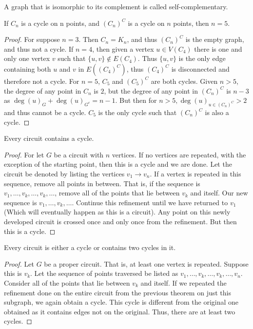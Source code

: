 \documentclass[crop=false,class=book]{standalone}
\begin{document}
\begin{definition}
A graph that is isomorphic to its complement is called self-complementary.
\end{definition}
\begin{theorem}
If $C_n$ is a cycle on n points, and $(C_n)^C$ is a cycle on $n$ points, then $n = 5$.
\end{theorem}
\begin{proof}
For suppose $n=3$. Then $C_n = K_n$, and thus $(C_n)^C$ is the empty graph, and thus not a cycle. If $n = 4$, then given a vertex $u\in V(C_4)$ there is one and only one vertex $v$ such that $\{u,v\} \notin E(C_4)$. Thus $\{u,v\}$ is the only edge containing both $u$ and $v$ in $E((C_4)^C)$, thus $(C_4)^C$ is disconnected and therefore not a cycle. For $n=5$, $C_5$ and $(C_5)^C$ are both cycles. Given $n>5$, the degree of any point in $C_{n}$ is $2$, but the degree of any point in $(C_n)^C$ is $n-3$ as $\deg(u)_G + \deg(u)_{G^c} = n-1$. But then for $n>5, \deg(u)_{u\in (C_n)^C} > 2$ and thus cannot be a cycle. $C_5$ is the only cycle such that $(C_n)^C$ is also a cycle.
\end{proof}
\begin{theorem}
Every circuit contains a cycle.
\end{theorem}
\begin{proof}
For let $G$ be a circuit with $n$ vertices. If no vertices are repeated, with the exception of the starting point, then this is a cycle and we are done. Let the circuit be denoted by listing the vertices $v_1 \rightarrow v_n$. If a vertex is repeated in this sequence, remove all points in between. That is, if the sequence is $v_1,\hdots, v_k,\hdots, v_k, \hdots$, remove all of the points that lie between $v_k$ and itself. Our new sequence is $v_1, \hdots, v_k, \hdots$. Continue this refinement until we have returned to $v_1$ (Which will eventually happen as this is a circuit). Any point on this newly developed circuit is crossed once and only once from the refinement. But then this is a cycle.
\end{proof}
\begin{theorem}
Every circuit is either a cycle or contains two cycles in it.
\end{theorem}
\begin{proof}
Let $G$ be a proper circuit. That is, at least one vertex is repeated. Suppose this is $v_k$. Let the sequence of points traversed be listed as $v_1,\hdots, v_k, \hdots,v_k, \hdots, v_n$. Consider all of the points that lie between $v_k$ and itself. If we repeated the refinement done on the entire circuit from the previous theorem on just this subgraph, we again obtain a cycle. This cycle is different from the original one obtained as it contains edges not on the original. Thus, there are at least two cycles.
\end{proof}
\end{document}
